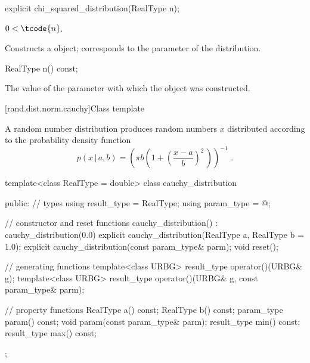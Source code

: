 %
\begin{itemdecl}
explicit chi_squared_distribution(RealType n);
\end{itemdecl}

\begin{itemdescr}
\pnum
\requires $0 < \tcode{n}$.

\pnum
\effects Constructs a  object;
 corresponds to the parameter of the distribution.
\end{itemdescr}

%
\begin{itemdecl}
RealType n() const;
\end{itemdecl}

\begin{itemdescr}
\pnum\returns The value of the  parameter
 with which the object was constructed.
\end{itemdescr}


[rand.dist.norm.cauchy]{Class template }%
%
%

\pnum
A  random number distribution
produces random numbers $x$
distributed according to
the probability density function%
%
%
\[  p(x\,|\,a,b) = \left(\pi b \left(1 + \left(\frac{x-a}{b} \right)^2 \, \right)\right)^{-1} \text{ .} \]

%
\begin{codeblock}
template<class RealType = double>
  class cauchy_distribution {
  public:
    // types
    using result_type = RealType;
    using param_type  = @\unspec@;

    // constructor and reset functions
    cauchy_distribution() : cauchy_distribution(0.0) {}
    explicit cauchy_distribution(RealType a, RealType b = 1.0);
    explicit cauchy_distribution(const param_type& parm);
    void reset();

    // generating functions
    template<class URBG>
      result_type operator()(URBG& g);
    template<class URBG>
      result_type operator()(URBG& g, const param_type& parm);

    // property functions
    RealType a() const;
    RealType b() const;
    param_type param() const;
    void param(const param_type& parm);
    result_type min() const;
    result_type max() const;
  };
\end{codeblock}


